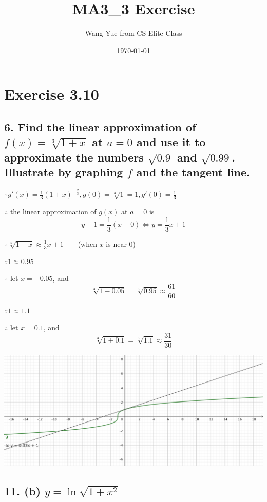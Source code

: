 \documentclass{article}
\begin{document}
    \title{MA3\_3 Exercise}
    \author{Wang Yue from CS Elite Class}
    \date{\today}

    \maketitle

    \section*{Exercise 3.10}

    \subsection*{6. Find the linear approximation of $f(x) = \sqrt[3]{1 + x}$ at $a = 0$ and use it to approximate the numbers $\sqrt{0.9}$ and $\sqrt{0.99}$. Illustrate by graphing $f$ and the tangent line.}

    $\because g'(x) = \frac 1 3 (1 + x)^{-\frac 2 3}, g(0) = \sqrt[3]{1} = 1, g'(0) = \frac 1 3$

    $\therefore$ the linear approximation of $g(x)$ at $a = 0$ is $$y - 1 = \frac 1 3(x - 0) \iff y = \frac 1 3 x + 1$$

    $\therefore \sqrt[3]{1 + x} \approx \frac 1 3 x + 1 \qquad $(when $x$ is near $0$)

    $\because 1 \approx 0.95$

    $\therefore $ let $x = -0.05$, and $$\sqrt[3]{1 - 0.05} = \sqrt[3]{0.95} \approx \frac{61}{60}$$

    $\because 1 \approx 1.1$
    
    $\therefore $ let $x = 0.1$, and $$\sqrt[3]{1 + 0.1} = \sqrt[3]{1.1} \approx \frac{31}{30}$$

    \includegraphics[scale=0.3]{6.png}

    \subsection*{11. (b) $y = \ln \sqrt{1 + x^2}$}
\end{document}
